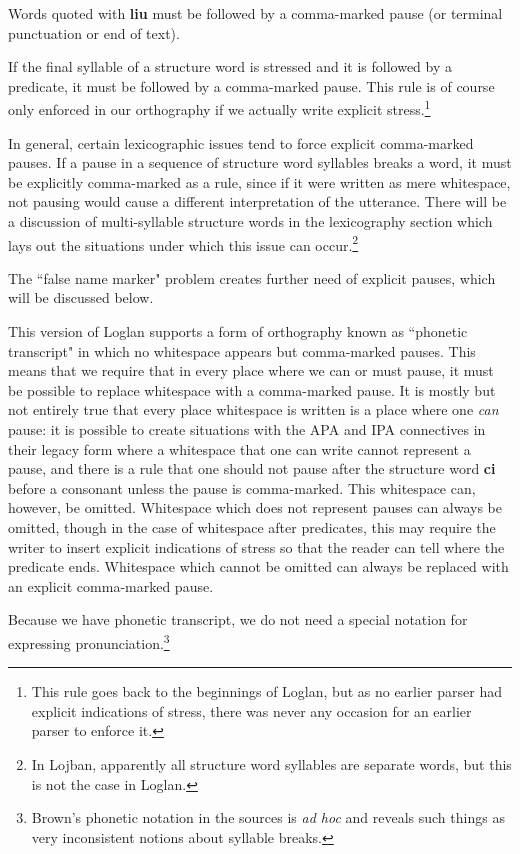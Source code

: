 \documentclass[12pt]{book}
\begin{document}
Words quoted with {\bf liu} must be followed by a comma-marked pause (or terminal punctuation or end of text).

If the final syllable of a structure word is stressed and it is followed by a predicate, it must be followed by a comma-marked pause.  This rule is of course only enforced in our orthography if we actually write explicit stress.\footnote{This rule goes back to the beginnings of Loglan, but as no earlier parser had explicit indications of stress, there was never any occasion for an earlier parser to enforce it.}

In general, certain lexicographic issues tend to force explicit comma-marked pauses.  If a pause in a sequence of structure word syllables breaks a word, it must be explicitly comma-marked as a rule, since if it were written as mere whitespace, not pausing would cause a different interpretation of the utterance.   There will be a discussion of multi-syllable structure words in the lexicography section which lays out the situations under which this issue can occur.\footnote{In Lojban, apparently all structure word syllables are separate words, but this is not the case in Loglan.}

The ``false name marker" problem creates further need of explicit pauses, which will be discussed below.

This version of Loglan supports a form of orthography known as ``phonetic transcript" in which no whitespace appears but comma-marked pauses.  This means that we require that
in every place where we can or must pause, it must be possible to replace whitespace with a comma-marked pause.  It is mostly but not entirely true that every place whitespace is written
is a place where one {\em can\/} pause:  it is possible to create situations with the APA and IPA connectives in their legacy form where a whitespace that one can write cannot represent a pause, and there is a rule that one should not pause after the structure word {\bf ci} before a consonant unless the pause is comma-marked.  This whitespace can, however, be omitted.  Whitespace which does not represent pauses can always be omitted, though in the case of whitespace after predicates, this may require the writer to insert explicit indications of stress so that the reader can tell where the predicate ends.  Whitespace which cannot be omitted can always be replaced with an explicit comma-marked pause.

Because we have phonetic transcript, we do not need a special notation for expressing pronunciation.\footnote{Brown's phonetic notation in the sources is {\em ad hoc} and reveals such things as very inconsistent notions about syllable breaks.}
\end{document}
